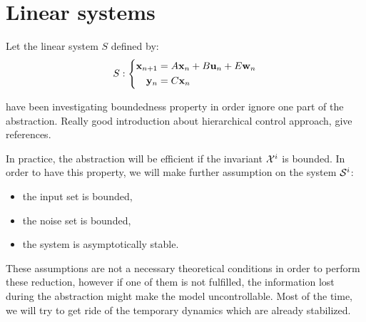 \newcommand{\xinf}{\underline{\vect{x}}}%
\newcommand{\xsup}{\overline{\vect{x}}}%
\newcommand{\xinit}{\vect{x}_0}%
\newcommand{\traj}{\varphi}%
\newcommand{\xn}{\vect{x}_n}%
\newcommand{\un}{\vect{u}_n}%
\newcommand{\wn}{\vect{w}_n}%
\newcommand{\yn}{\vect{y}_n}%
\newcommand{\xnn}{\vect{x}_{n+1}}%
\newcommand{\Sproc}{$\mathcal{S}$-procedure}%
%
\section{Linear systems}
Let the linear system $S$ defined by:
\begin{equation} \label{lin_sys}
S:
\left\{
\begin{aligned}
\xnn &= A \xn + B \un + E \wn \\
\yn &= C \xn
\end{aligned}
\right.
\end{equation}

\cite{liu2014abstraction} have been investigating boundedness property in order ignore one part of the abstraction.
Really good introduction about hierarchical control approach, give references.

In practice, the abstraction will be efficient if the invariant ${\mathcal{X}^i}$ is bounded.
In order to have this property, we will make further assumption on the system $\mathcal{S}^i$:
\begin{itemize}[noitemsep,nolistsep]
\item the input set is bounded,
\item the noise set is bounded,
\item the system is asymptotically stable.
\end{itemize}
These assumptions are not a necessary theoretical conditions in order to perform these reduction, however if one of them is not fulfilled, the information lost during the abstraction might make the model uncontrollable.
Most of the time, we will try to get ride of the temporary dynamics which are already stabilized.

